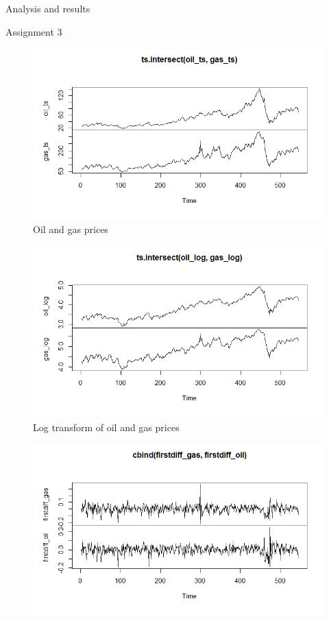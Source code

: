\documentclass{article}
\begin{document}
\begin{section}{Analysis and results}
\begin{subsection}{Assignment 3}
\begin{figure}[ht!]
    \centering
    \includegraphics[scale=0.4]{oilandgas}
    \caption{Oil and gas prices}
    \label{fig:oilandgas}
\end{figure}
\begin{figure}[ht!]
    \centering
    \includegraphics[scale=0.4]{oilandgaslog}
    \caption{Log transform of oil and gas prices}
    \label{fig:oilandgaslog}
\end{figure}
\begin{figure}[ht!]
    \centering
    \includegraphics[scale=0.4]{oilandgasfirstdiff}

\end{figure}
\end{subsection}
\end{section}
\end{document}
